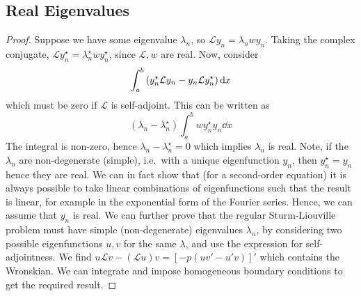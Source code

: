 \subsection{Real Eigenvalues}
\begin{proof}
	Suppose we have some eigenvalue \( \lambda_n \), so \( \mathcal L y_n = \lambda_n w y_n \).
	Taking the complex conjugate, \( \mathcal L y_n^\star = \lambda_n^\star w y_n^\star \), since \( \mathcal L, w \) are real.
	Now, consider
	\[
		\int_a^b \qty(y_n^\star \mathcal L y_n - y_n \mathcal L y_n^\star) \dd{x}
	\]
	which must be zero if \( \mathcal L \) is self-adjoint.
	This can be written as
	\[
		(\lambda_n - \lambda_n^\star) \int_a^b w y_n^\star y_n \dd{x}
	\]
	The integral is non-zero, hence \( \lambda_n - \lambda_n^\star = 0 \) which implies \( \lambda_n \) is real.
	Note, if the \( \lambda_n \) are non-degenerate (simple), i.e.\ with a unique eigenfunction \( y_n \), then \( y_n^\star = y_n \) hence they are real.
	We can in fact show that (for a second-order equation) it is always possible to take linear combinations of eigenfunctions such that the result is linear, for example in the exponential form of the Fourier series.
	Hence, we can assume that \( y_n \) is real.
	We can further prove that the regular Sturm-Liouville problem must have simple (non-degenerate) eigenvalues \( \lambda_n \), by considering two possible eigenfunctions \( u, v \) for the same \( \lambda \), and use the expression for self-adjointness.
	We find \( u \mathcal L v - (\mathcal L u) v = [-p(uv' - u'v)]' \) which contains the Wronskian.
	We can integrate and impose homogeneous boundary conditions to get the required result.
\end{proof}
